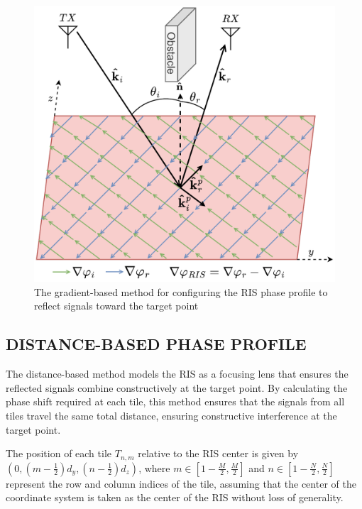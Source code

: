 \documentclass{IEEEoj}
\begin{document}
\begin{figure}
	\centering \includegraphics[width=\linewidth]{RIS_Phase_Gradient.png}
	\caption{The gradient-based method for configuring the RIS phase profile to reflect signals toward the target point}
	\label{RIS_Phase_Gradient}
\end{figure}

\subsection{DISTANCE-BASED PHASE PROFILE}
The distance-based method models the RIS as a focusing lens that ensures the reflected signals combine constructively at the target point. By calculating the phase shift required at each tile, this method ensures that the signals from all tiles travel the same total distance, ensuring constructive interference at the target point.

The position of each tile $T_{n,m}$ relative to the RIS center is given by $(0, (m-\frac{1}{2})d_y, (n-\frac{1}{2})d_z)$, where $m \in \left[ 1 - \frac{M}{2}, \frac{M}{2} \right]$ and $n \in \left[ 1 - \frac{N}{2}, \frac{N}{2} \right]$ represent the row and column indices of the tile, assuming that the center of the coordinate system is taken as the center of the RIS without loss of generality.
\end{document}
